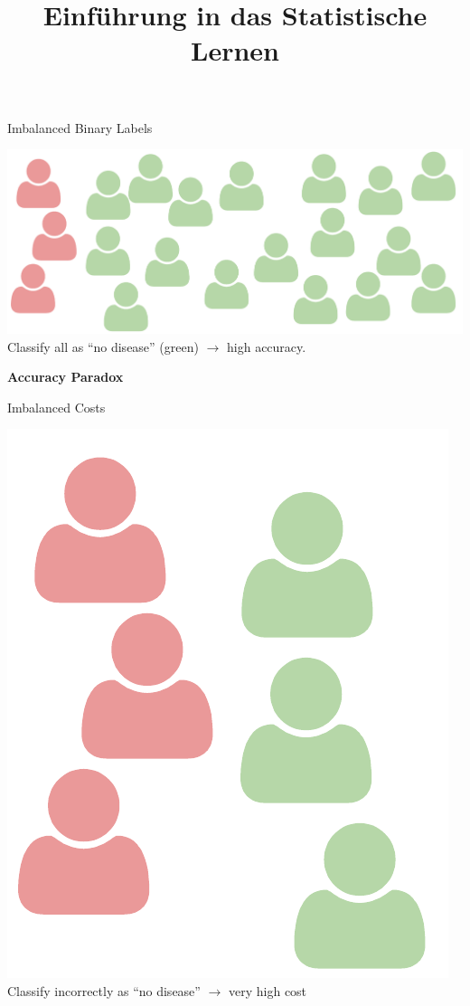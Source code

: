 \documentclass[11pt,compress,t,notes=noshow, xcolor=table]{beamer}
\title{Einführung in das Statistische Lernen}
\institute{\href{https://compstat-lmu.github.io/lecture_i2ml/}{compstat-lmu.github.io/lecture\_i2ml}}
\date{}
\begin{document}











\begin{vbframe}{Imbalanced Binary Labels}

\begin{center}
\includegraphics[width=.9\textwidth]{figure_man/imbalanced.pdf}\\
Classify all as \enquote{no disease} (green) $\rightarrow$ high accuracy.

\lz

\textbf{Accuracy Paradox}
\end{center}

\end{vbframe}


\begin{vbframe}{Imbalanced Costs}

\begin{center}
\includegraphics[width=.3\textwidth]{figure_man/imbalanced-costs.pdf}\\
Classify incorrectly as \enquote{no disease} $\rightarrow$ very high cost

\end{center}

\end{vbframe}
\end{document}
